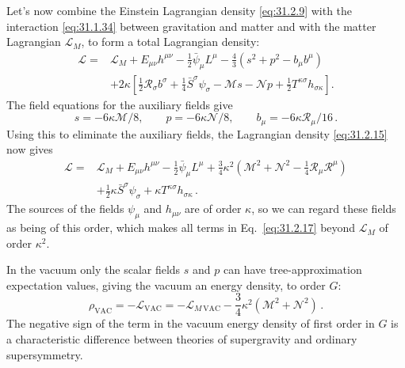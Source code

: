 Let's now combine the Einstein Lagrangian density \eqref{eq:31.2.9} with the
interaction\newline
\eqref{eq:31.1.34} between gravitation and matter and with the
matter Lagrangian \(\mathcal L_M\), to form a total Lagrangian density:
\begin{equation}
  \begin{aligned}
  \mathcal L={}&
    \mathcal L_M+E_{\mu\nu}h^{\mu\nu}
    -\frac12\bar\psi_\mu L^\mu
    -\frac43(s^2+p^2-b_\mu b^\mu)
  \\
  &+2\kappa\left[
      \frac12\mathcal R_\sigma b^\sigma
      +\frac14\bar S^\sigma\psi_\sigma
      -\mathcal M s-\mathcal Np
      +\frac12T^{\kappa\sigma}h_{\sigma\kappa}
    \right].
  \end{aligned}
  \tag{31.2.15}\label{eq:31.2.15}
\end{equation}
The field equations for the auxiliary fields give
\begin{equation}
  s=-6\kappa\mathcal M/8,\qquad
  p=-6\kappa\mathcal N/8,\qquad
  b_\mu=-6\kappa\mathcal R_\mu/16\,.
  \tag{31.2.16}\label{eq:31.2.16}
\end{equation}
Using this to eliminate the auxiliary fields, the Lagrangian density
\eqref{eq:31.2.15} now gives
\begin{equation}
  \begin{aligned}
  \mathcal L={}&
    \mathcal L_M+E_{\mu\nu}h^{\mu\nu}
    -\frac12\bar\psi_\mu L^\mu
    +\frac34\kappa^2
     \left(\mathcal M^2+\mathcal N^2
           -\frac14\mathcal R_\mu\mathcal R^\mu\right)
  \\
  &+\frac12\kappa\bar S^\sigma\psi_\sigma
    +\kappa T^{\kappa\sigma}h_{\sigma\kappa}\,.
  \end{aligned}
  \tag{31.2.17}\label{eq:31.2.17}
\end{equation}
The sources of the fields \(\psi_\mu\) and \(h_{\mu\nu}\) are of order
\(\kappa\), so we can regard these fields as being of this order, which makes
all terms in Eq.~\eqref{eq:31.2.17} beyond \(\mathcal L_M\) of order
\(\kappa^2\).

In the vacuum only the scalar fields \(s\) and \(p\) can have
tree-approximation expectation values, giving the vacuum an energy density,
to order \(G\):
\begin{equation}
  \rho_{\mathrm{VAC}}
  =-\mathcal L_{\mathrm{VAC}}
  =-\mathcal L_{M\,\mathrm{VAC}}
   -\frac34\kappa^2(\mathcal M^2+\mathcal N^2)\,.
  \tag{31.2.18}\label{eq:31.2.18}
\end{equation}
The negative sign of the term in the vacuum energy density of first order in
\(G\) is a characteristic difference between theories of supergravity and
ordinary supersymmetry.

